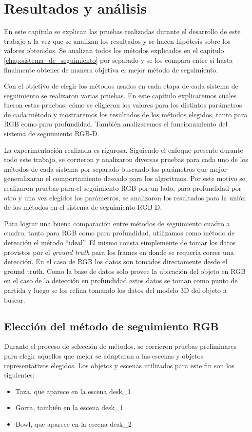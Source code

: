 \chapter{Resultados y análisis}\label{chap:resultados}
En este capítulo se explican las pruebas realizadas durante el desarrollo de este trabajo a la vez que se analizan los resultados y se hacen hipótesis sobre los valores obtenidos. Se analizan todos los métodos explicados en el capítulo \ref{chap:sistema_de_seguimiento} por separado y se los compara entre sí hasta finalmente obtener de manera objetiva el mejor método de seguimiento.

Con el objetivo de elegir los métodos usados en cada etapa de cada sistema de seguimiento se realizaron varias pruebas. En este capítulo explicaremos cuales fueron estas pruebas, cómo se eligieron los valores para los distintos parámetros de cada método y mostraremos los resultados de los métodos elegidos, tanto para RGB como para profundidad. También analizaremos el funcionamiento del sistema de seguimiento RGB-D.

La experimentación realizada es rigurosa. Siguiendo el enfoque presente durante todo este trabajo, se corrieron y analizaron diversas pruebas para cada uno de los métodos de cada sistema por separado buscando los parámetros que mejor generalizaran el comportamiento deseado para los algoritmos. Por este motivo se realizaron pruebas para el seguimiento RGB por un lado, para profundidad por otro y una vez elegidos los parámetros, se analizaron los resultados para la unión de los métodos en el sistema de seguimiento RGB-D.

Para lograr una buena comparación entre métodos de seguimiento cuadro a cuadro, tanto para RGB como para profundidad, utilizamos como método de detección el método ``ideal''. El mismo consta simplemente de tomar los datos provistos por el \textit{ground truth} para los frames en donde se requería correr una detección. En el caso de RGB los datos son tomados directamente desde el ground truth. Como la base de datos solo provee la ubicación del objeto en RGB en el caso de la detección en profundidad estos datos se toman como punto de partida y luego se los refina tomando los datos del modelo 3D del objeto a buscar.

\section{Elección del método de seguimiento RGB}\label{sec:eleccion_rgb}
Durante el proceso de selección de métodos, se corrieron pruebas preliminares para elegir aquellos que mejor se adaptaran a las escenas y objetos representativos elegidos. Los objetos y escenas utilizados para este fin son los siguientes:
\begin{itemize}
	\item Taza, que aparece en la escena desk\_1
	\item Gorra, también en la escena desk\_1
	\item Bowl, que aparece en la escena desk\_2
\end{itemize}

